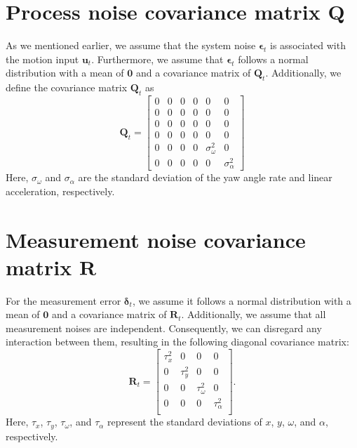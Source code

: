 \documentclass[12pt, a4paper]{article}
\begin{document}
\section{Process noise covariance matrix $\bm{Q}$}
As we mentioned earlier, we assume that the system noise $\bm{\epsilon}_{t}$ is associated with the motion input $\bm{u}_{t}$. Furthermore, we assume that $\bm{\epsilon}_{t}$ follows a normal distribution with a mean of $\bm{0}$ and a covariance matrix of $\bm{Q}_{t}$. Additionally, we define the covariance matrix $\bm{Q}_{t}$ as
\[
  \bm{Q}_{t}=\begin{bmatrix}
    0 & 0 & 0 & 0 & 0 & 0\\
    0 & 0 & 0 & 0 & 0 & 0\\
    0 & 0 & 0 & 0 & 0 & 0\\
    0 & 0 & 0 & 0 & 0 & 0\\
    0 & 0 & 0 & 0 &\sigma_{\omega}^{2} & 0\\
    0 & 0 & 0 & 0 &0 & \sigma_{\alpha}^{2}
  \end{bmatrix}
\]
Here, $\sigma_{\omega}$ and $\sigma_{\alpha}$ are the standard deviation of the yaw angle rate and linear acceleration, respectively. %

\section{Measurement noise covariance matrix $\bm{R}$}
For the measurement error $\bm{\delta}_{t}$, we assume it follows a normal distribution with a mean of $\bm{0}$ and a covariance matrix of $\bm{R}_{t}$. Additionally, we assume that all measurement noises are independent. Consequently, we can disregard any interaction between them, resulting in the following diagonal covariance matrix:
\[
  \bm{R}_{t} = \begin{bmatrix}
    \tau_{x}^2 & 0 & 0 & 0\\
    0 & \tau_{y}^2 & 0 & 0\\
    0 & 0 & \tau_{\omega}^2 & 0\\
    0 & 0 & 0 & \tau_{\alpha}^2\\
  \end{bmatrix}.
\]
Here, $\tau_{x}$, $\tau_{y}$, $\tau_{\omega}$, and $\tau_{\alpha}$ represent the standard deviations of $x$, $y$, $\omega$, and $\alpha$, respectively.
\end{document}

